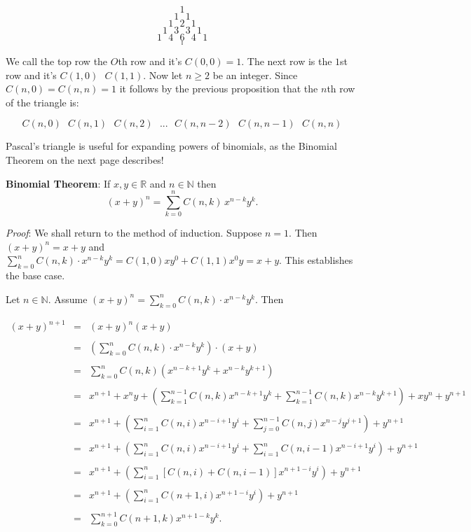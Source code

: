 \documentclass[12pt]{amsart}
\theoremstyle{definition}
\theoremstyle{remark}
\newcommand{\nats}{\mathbb N}
\newcommand{\reals}{\mathbb R}
\begin{document}
$$1$$
$$1\mbox{  }1$$
$$1\mbox{  }2\mbox{  }1$$
$$1\mbox{  }3\mbox{  }3\mbox{ }1$$
$$1\mbox{  }4\mbox{  }6\mbox{  }4\mbox{  }1$$
$$.$$
$$.$$
$$.$$



We call the top row the $O$th row and it's $C(0,0)=1$.  The next row is the $1$st row and it's $C(1,0)\mbox{ }C(1,1)$.  Now let $n\geq 2$ be an integer.  Since $C(n,0)=C(n,n)=1$ it follows by the previous proposition that the $n$th row of the triangle is:


$$C(n,0)\mbox{ } C(n,1)\mbox{ } C(n,2)\mbox{ }...\mbox{ }C(n,n-2)\mbox{ } C(n,n-1)\mbox{ } C(n,n)$$


Pascal's triangle is useful for expanding powers of binomials, as the Binomial Theorem on the next page describes!

\newpage

\textbf{Binomial Theorem}:  If $x,y\in \reals$ and $n\in \nats$ then $$(x+y)^{n}=\sum_{k=0}^{n}{C(n,k)\, x^{n-k}y^{k}}.$$

\emph{Proof}:  We shall return to the method of induction.  Suppose $n=1$.  Then $(x+y)^{n}=x+y$ and $\displaystyle \sum_{k=0}^{n}{C(n,k)\cdot x^{n-k}y^{k}}=C(1,0)xy^{0}+C(1,1)x^{0}y=x+y$.  This establishes the base case.

\medskip

Let $n\in\nats$.  Assume $\displaystyle (x+y)^{n}=\sum_{k=0}^{n}{C(n,k)\cdot x^{n-k}y^{k}}$.  Then

\begin{eqnarray*}
(x+y)^{n+1} &=& (x+y)^{n}(x+y) \\
\\
&=& \left(\sum_{k=0}^{n}{C(n,k)\cdot x^{n-k}y^{k}}\right)\cdot (x+y)  \\
\\
&=& \sum_{k=0}^{n}{C(n,k) \left(x^{n-k+1}y^{k}+x^{n-k}y^{k+1}\right)} \\
\\
&=& x^{n+1}+x^{n}y+\left(\sum_{k=1}^{n-1}{C(n,k)x^{n-k+1}y^{k}}+\sum_{k=1}^{n-1}{C(n,k)x^{n-k}y^{k+1}}\right)+xy^{n}+y^{n+1}  \\
\\
&=& x^{n+1}+\left(\sum_{i=1}^{n}{C(n,i)x^{n-i+1}y^{i}}+\sum_{j=0}^{n-1}{C(n,j)x^{n-j}y^{j+1}}\right)+y^{n+1} \\
\\
&=& x^{n+1}+\left(\sum_{i=1}^{n}{C(n,i)x^{n-i+1}y^{i}}+\sum_{i=1}^{n}{C(n,i-1)x^{n-i+1}y^{i}}\right)+y^{n+1}  \\
\\
&=& x^{n+1}+\left(\sum_{i=1}^{n}{\left[C(n,i)+C(n,i-1)\right]x^{n+1-i}y^{i}}\right)+y^{n+1}\\
\\
&=& x^{n+1}+\left(\sum_{i=1}^{n}{C(n+1,i)x^{n+1-i}y^{i}}\right)+y^{n+1} \\
\\
&=&\sum_{k=0}^{n+1}{C(n+1,k)x^{n+1-k}y^{k}}.\end{eqnarray*}
\end{document}
